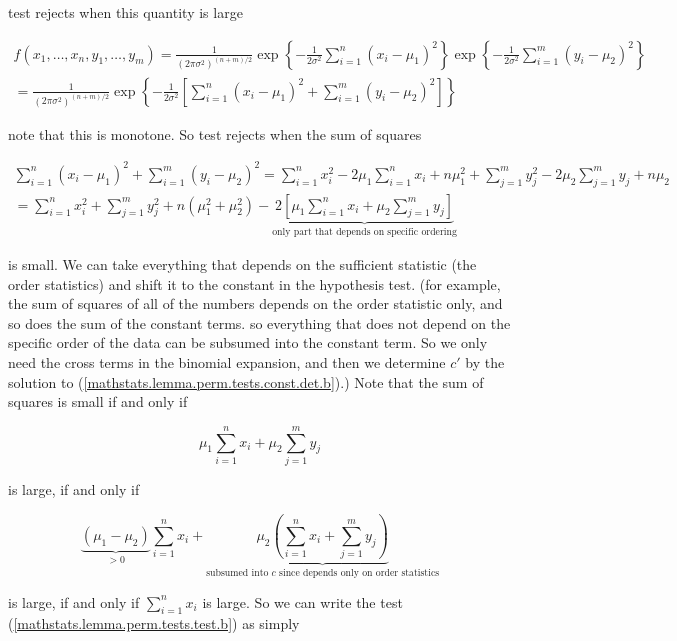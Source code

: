 \begin{solution}

test rejects when this quantity is large

\begin{multline*}
f(x_1, \ldots, x_n, y_1, \ldots, y_m) = \frac{1}{(2 \pi \sigma^2)^{(n+m)/2}} \exp \left\{ - \frac{1}{2 \sigma^2} \sum_{i=1}^n (x_i - \mu_1)^2 \right\}\exp \left\{ - \frac{1}{2 \sigma^2} \sum_{i=1}^m (y_i - \mu_2)^2 \right\}
\\ =  \frac{1}{(2 \pi \sigma^2)^{(n+m)/2}} \exp \left\{ - \frac{1}{2 \sigma^2} \left[ \sum_{i=1}^n (x_i - \mu_1)^2 + \sum_{i=1}^m (y_i - \mu_2)^2  \right] \right\}
\end{multline*}

note that this is monotone. So test rejects when the sum of squares 

\begin{multline}
\sum_{i=1}^n (x_i - \mu_1)^2 + \sum_{i=1}^m (y_i - \mu_2)^2 = \sum_{i=1}^n x_i^2 - 2 \mu_1 \sum_{i=1}^n x_i + n \mu_1^2 + \sum_{j=1}^m y_j^2 - 2 \mu_2 \sum_{j=1}^m y_j + n \mu_2
\\ =  \sum_{i=1}^n x_i^2  + \sum_{j=1}^m y_j^2 + n( \mu_1^2  + \mu_2^2) - \underbrace{2\left[ \mu_1 \sum_{i=1}^n x_i   +  \mu_2 \sum_{j=1}^m y_j  \right]}_{\text{only part that depends on specific ordering}}
\end{multline}

is small. We can take everything that depends on the sufficient statistic (the order statistics) and shift it to the constant in the hypothesis test. (for example, the sum of squares of all of the numbers depends on the order statistic only, and so does the sum of the constant terms. so everything that does not depend on the specific order of the data can be subsumed into the constant term. So we only need the cross terms in the binomial expansion, and then we determine \(c'\) by the solution to (\ref{mathstats.lemma.perm.tests.const.det.b}).) Note that the sum of squares is small if and only if

\[
\mu_1 \sum_{i=1}^n x_i + \mu_2 \sum_{j=1}^m y_j 
\]

is large, if and only if 

\[
\underbrace{(\mu_1 - \mu_2)}_{>0} \sum_{i=1}^n x_i + \underbrace{\mu_2 \left(\sum_{i=1}^n x_i + \sum_{j=1}^m y_j \right) }_{\text{subsumed into } c \text{ since depends only on order statistics}}
\]

is large, if and only if \(\sum_{i=1}^n x_i\) is large. So we can write the test (\ref{mathstats.lemma.perm.tests.test.b}) as simply


\end{solution}
